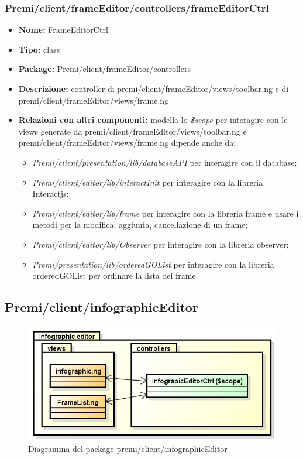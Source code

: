 \subsubsection{Premi/client/frameEditor/controllers/frameEditorCtrl}
\begin{itemize}
  \item[] \textbf{Nome:} FrameEditorCtrl
  \item[] \textbf{Tipo:} class
  \item[] \textbf{Package:} Premi/client/frameEditor/controllers
  \item[] \textbf{Descrizione:} controller di premi/client/frameEditor/views/toolbar.ng e di premi/client/frameEditor/views/frame.ng
  \item[] \textbf{Relazioni con altri componenti:} modella lo \textit{\$scope} per interagire con le views generate da premi/client/frameEditor/views/toolbar.ng e premi/client/frameEditor/views/frame.ng dipende anche da:
 \begin{itemize} 
	\item \textit{Premi/client/presentation/lib/databaseAPI} per interagire con il database;  
	\item \textit{Premi/client/editor/lib/interactInit} per interagire con la libreria Interactjs;
	\item \textit{Premi/client/editor/lib/frame} per interagire con la libreria frame e usare i metodi per la modifica, aggiunta, cancellazione di un frame;
	\item \textit{Premi/client/editor/lib/Observer} per interagire con la libreria observer; 
	\item \textit{Premi/presentation/lib/orderedGOList} per interagire con la libreria orderedGOList per ordinare la lista dei frame. 
  \end{itemize} 
\end{itemize}

\clearpage
\subsection{Premi/client/infographicEditor}
\begin{figure}[!h]
\begin{center}
\includegraphics[scale=0.45]{img/diapkg/infographicEditor.png}
\caption{Diagramma del package premi/client/infographicEditor}
\end{center}
\end{figure}
